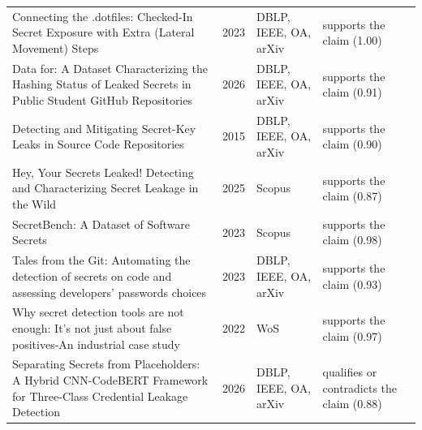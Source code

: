 \begin{longtable}{@{}%
  >{\raggedright\arraybackslash}p{}c%
  >{\raggedright\arraybackslash}p{}%
  >{\raggedright\arraybackslash}p{}@{}}
Connecting the .dotfiles: Checked-In Secret Exposure with Extra (Lateral Movement) Steps & 2023 & DBLP, IEEE, OA, arXiv & supports the claim (1.00) \\
Data for: A Dataset Characterizing the Hashing Status of Leaked Secrets in Public Student GitHub Repositories & 2026 & DBLP, IEEE, OA, arXiv & supports the claim (0.91) \\
Detecting and Mitigating Secret-Key Leaks in Source Code Repositories & 2015 & DBLP, IEEE, OA, arXiv & supports the claim (0.90) \\
Hey, Your Secrets Leaked! Detecting and Characterizing Secret Leakage in the Wild & 2025 & Scopus & supports the claim (0.87) \\
SecretBench: A Dataset of Software Secrets & 2023 & Scopus & supports the claim (0.98) \\
Tales from the Git: Automating the detection of secrets on code and assessing developers' passwords choices & 2023 & DBLP, IEEE, OA, arXiv & supports the claim (0.93) \\
Why secret detection tools are not enough: It's not just about false positives-An industrial case study & 2022 & WoS & supports the claim (0.97) \\
Separating Secrets from Placeholders: A Hybrid CNN-CodeBERT Framework for Three-Class Credential Leakage Detection & 2026 & DBLP, IEEE, OA, arXiv & qualifies or contradicts the claim (0.88) \\
\end{longtable}
\endgroup
